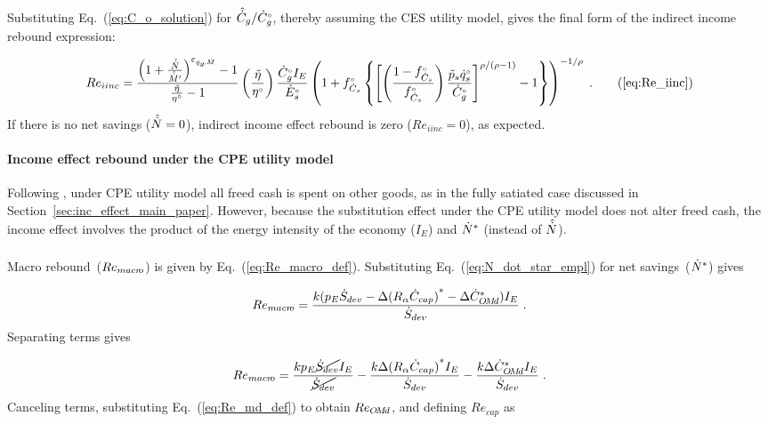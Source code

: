 Substituting Eq.~(\ref{eq:C_o_solution}) 
for $\hat{\dot{C}}_g / {}{\dot{C}}^{\scriptscriptstyle \circ}_g$, 
thereby assuming the CES utility model,
gives the final form 
of the indirect income rebound expression:

\begin{equation}
  Re_{iinc} = \Reiinceqnexact{} \; . \tag{\ref{eq:Re_iinc}}
\end{equation}
%
If there is no net savings ($\hat{\dot{N}} = 0$), 
indirect income effect rebound is zero ($Re_{iinc} = 0$), as expected.


\paragraph{Income effect rebound under the CPE utility model} 
\label{sec:income_effect_CPE}

Following \citet{Borenstein:2015aa}, 
under CPE utility model
all freed cash is spent on other goods, 
as in the fully satiated case discussed 
in Section~\ref{sec:inc_effect_main_paper}.
However, because the substitution effect 
under the CPE utility model
does not alter freed cash, 
the income effect 
involves the product of 
the energy intensity of the economy ($I_E$) 
and ${\dot{N}}^*$ 
(instead of $\hat{\dot{N}}$).


\subsubsection{\Macroeffect{}} 
\label{sec:Re_macro}

Macro rebound~($Re_{macr\!o}$) is given by Eq.~(\ref{eq:Re_macro_def}).
Substituting Eq.~(\ref{eq:N_dot_star_empl}) for net savings~(${\dot{N}}^*$) gives

\begin{equation}
  Re_{macr\!o} = \frac{k (p_E \dot{S}_{dev} - \Delta {(R_\alpha \dot{C}_{cap})}^* - \Delta {\dot{C}}^*_{O\!M\!d}) I_E}{\dot{S}_{dev}} \; .
\end{equation}
%
Separating terms gives

\begin{equation}
  Re_{macr\!o} = \frac{k p_E \cancel{\dot{S}_{dev}} I_E}{\cancel{\dot{S}_{dev}}}
                                - \frac{k \Delta {(R_\alpha  \dot{C}_{cap})}^* I_E}{\dot{S}_{dev}}
                                - \frac{k \Delta {\dot{C}}^*_{O\!M\!d} I_E}{\dot{S}_{dev}} \; .
\end{equation}
%
Canceling terms, substituting Eq.~(\ref{eq:Re_md_def}) to obtain $Re_{O\!M\!d}$, and
defining $Re_{cap}$ as

